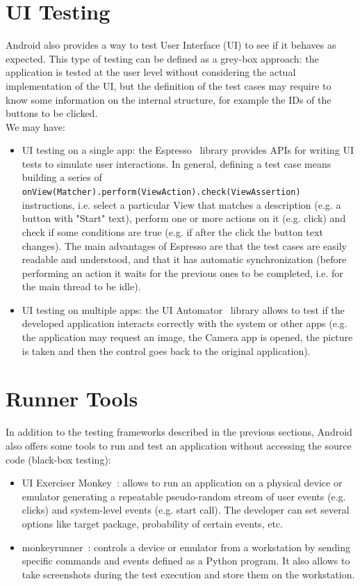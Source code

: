 \documentclass[11pt,a4paper,notitlepage]{article}
\begin{document}
\section{UI Testing}
Android also provides a way to test User Interface (UI) to see if it behaves as expected. This type of testing can be defined as a grey-box approach: the application is tested at the user level without considering the actual implementation of the UI, but the definition of the test cases may require to know some information on the internal structure, for example the IDs of the buttons to be clicked.\medskip \\
We may have:
\begin{itemize}
	\item UI testing on a single app: the Espresso~\cite{Espresso} library provides APIs for writing UI tests to simulate user interactions. In general, defining a test case means building a series of \texttt{onView(Matcher).perform(ViewAction).check(ViewAssertion)} instructions, i.e. select a particular View that matches a description (e.g. a button with "Start" text), perform one or more actions on it (e.g. click) and check if some conditions are true (e.g. if after the click the button text changes). The main advantages of Espresso are that the test cases are easily readable and understood, and that it has automatic synchronization (before performing an action it waits for the previous ones to be completed, i.e. for the main thread to be idle).
	\item UI testing on multiple apps: the UI Automator~\cite{UIAutomator} library allows to test if the developed application interacts correctly with the system or other apps (e.g. the application may request an image, the Camera app is opened, the picture is taken and then the control goes back to the original application). 
\end{itemize}

\section{Runner Tools}
In addition to the testing frameworks described in the previous sections, Android also offers some tools to run and test an application without accessing the source code (black-box testing):
\begin{itemize}
	\item UI Exerciser Monkey~\cite{UIExerciserMonkey}: allows to run an application on a physical device or emulator generating a repeatable pseudo-random stream of user events (e.g. clicks) and system-level events (e.g. start call). The developer can set several options like target package, probability of certain events, etc.
	\item monkeyrunner~\cite{monkeyrunner}: controls a device or emulator from a workstation by sending specific commands and events defined as a Python program. It also allows to take screenshots during the test execution and store them on the workstation.
\end{itemize}
\end{document}
